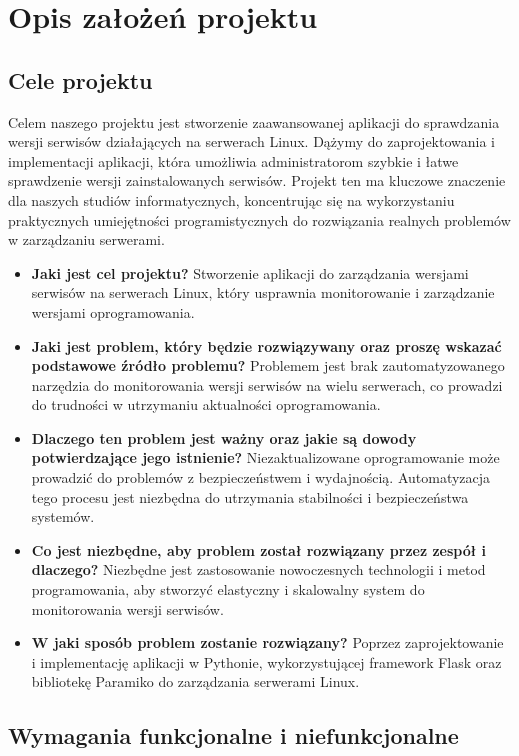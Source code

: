 \chapter{Opis założeń projektu}
\section{Cele projektu}

Celem naszego projektu jest stworzenie zaawansowanej aplikacji do sprawdzania wersji serwisów działających na serwerach Linux. Dążymy do zaprojektowania i implementacji aplikacji, która umożliwia administratorom szybkie i łatwe sprawdzenie wersji zainstalowanych serwisów. Projekt ten ma kluczowe znaczenie dla naszych studiów informatycznych, koncentrując się na wykorzystaniu praktycznych umiejętności programistycznych do rozwiązania realnych problemów w zarządzaniu serwerami.

\begin{itemize}
\item \textbf{Jaki jest cel projektu?} Stworzenie aplikacji do zarządzania wersjami serwisów na serwerach Linux, który usprawnia monitorowanie i zarządzanie wersjami oprogramowania.
\item \textbf{Jaki jest problem, który będzie rozwiązywany oraz proszę wskazać podstawowe źródło problemu?} Problemem jest brak zautomatyzowanego narzędzia do monitorowania wersji serwisów na wielu serwerach, co prowadzi do trudności w utrzymaniu aktualności oprogramowania.
\item \textbf{Dlaczego ten problem jest ważny oraz jakie są dowody potwierdzające jego istnienie?} Niezaktualizowane oprogramowanie może prowadzić do problemów z bezpieczeństwem i wydajnością. Automatyzacja tego procesu jest niezbędna do utrzymania stabilności i bezpieczeństwa systemów.
\item \textbf{Co jest niezbędne, aby problem został rozwiązany przez zespół i dlaczego?} Niezbędne jest zastosowanie nowoczesnych technologii i metod programowania, aby stworzyć elastyczny i skalowalny system do monitorowania wersji serwisów.
\item \textbf{W jaki sposób problem zostanie rozwiązany?} Poprzez zaprojektowanie i implementację aplikacji w Pythonie, wykorzystującej framework Flask oraz bibliotekę Paramiko do zarządzania serwerami Linux.
\end{itemize}

\section{Wymagania funkcjonalne i niefunkcjonalne}

